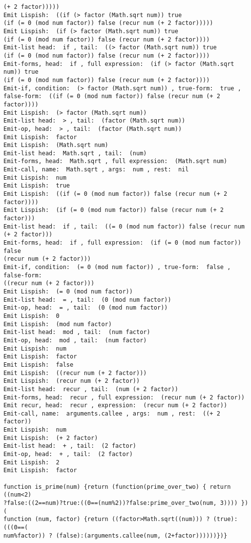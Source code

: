 \begin{verbatim}
(+ 2 factor)))))
Emit Lispish:  ((if (> factor (Math.sqrt num)) true 
(if (= 0 (mod num factor)) false (recur num (+ 2 factor)))))
Emit Lispish:  (if (> factor (Math.sqrt num)) true 
(if (= 0 (mod num factor)) false (recur num (+ 2 factor))))
Emit-list head:  if , tail:  ((> factor (Math.sqrt num)) true 
(if (= 0 (mod num factor)) false (recur num (+ 2 factor))))
Emit-forms, head:  if , full expression:  (if (> factor (Math.sqrt num)) true 
(if (= 0 (mod num factor)) false (recur num (+ 2 factor))))
Emit-if, condition:  (> factor (Math.sqrt num)) , true-form:  true , 
false-form:  ((if (= 0 (mod num factor)) false (recur num (+ 2 factor))))
Emit Lispish:  (> factor (Math.sqrt num))
Emit-list head:  > , tail:  (factor (Math.sqrt num))
Emit-op, head:  > , tail:  (factor (Math.sqrt num))
Emit Lispish:  factor
Emit Lispish:  (Math.sqrt num)
Emit-list head:  Math.sqrt , tail:  (num)
Emit-forms, head:  Math.sqrt , full expression:  (Math.sqrt num)
Emit-call, name:  Math.sqrt , args:  num , rest:  nil
Emit Lispish:  num
Emit Lispish:  true
Emit Lispish:  ((if (= 0 (mod num factor)) false (recur num (+ 2 factor))))
Emit Lispish:  (if (= 0 (mod num factor)) false (recur num (+ 2 factor)))
Emit-list head:  if , tail:  ((= 0 (mod num factor)) false (recur num 
(+ 2 factor)))
Emit-forms, head:  if , full expression:  (if (= 0 (mod num factor)) false 
(recur num (+ 2 factor)))
Emit-if, condition:  (= 0 (mod num factor)) , true-form:  false , false-form:
((recur num (+ 2 factor)))
Emit Lispish:  (= 0 (mod num factor))
Emit-list head:  = , tail:  (0 (mod num factor))
Emit-op, head:  = , tail:  (0 (mod num factor))
Emit Lispish:  0
Emit Lispish:  (mod num factor)
Emit-list head:  mod , tail:  (num factor)
Emit-op, head:  mod , tail:  (num factor)
Emit Lispish:  num
Emit Lispish:  factor
Emit Lispish:  false
Emit Lispish:  ((recur num (+ 2 factor)))
Emit Lispish:  (recur num (+ 2 factor))
Emit-list head:  recur , tail:  (num (+ 2 factor))
Emit-forms, head:  recur , full expression:  (recur num (+ 2 factor))
Emit recur, head:  recur , expression:  (recur num (+ 2 factor))
Emit-call, name:  arguments.callee , args:  num , rest:  ((+ 2 factor))
Emit Lispish:  num
Emit Lispish:  (+ 2 factor)
Emit-list head:  + , tail:  (2 factor)
Emit-op, head:  + , tail:  (2 factor)
Emit Lispish:  2
Emit Lispish:  factor

function is_prime(num) {return (function(prime_over_two) { return ((num<2)
?false:((2==num)?true:((0==(num%2))?false:prime_over_two(num, 3)))) })(
function (num, factor) {return ((factor>Math.sqrt((num))) ? (true):(((0==(
num%factor)) ? (false):(arguments.callee(num, (2+factor))))))})}
\end{verbatim}

